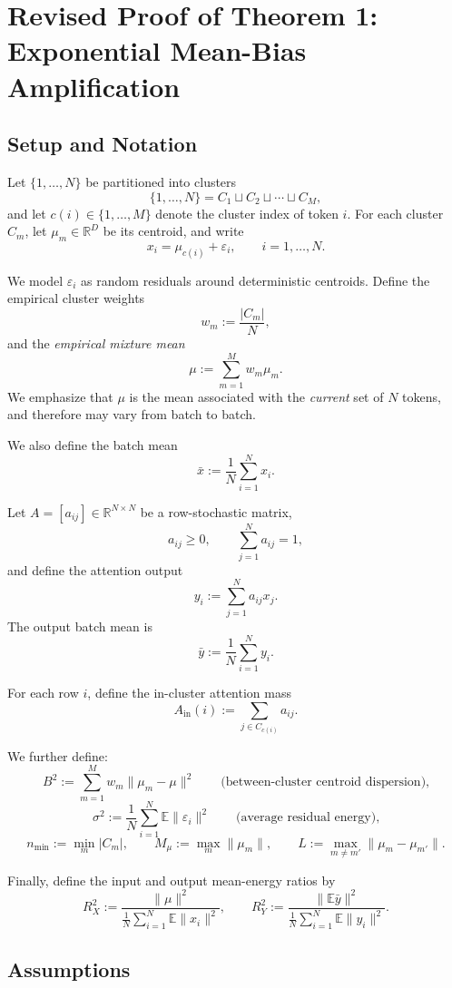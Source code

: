 \section{Revised Proof of Theorem 1: Exponential Mean-Bias Amplification}
\label{appendix:proof_theorem1_revised}

\subsection{Setup and Notation}

Let $\{1,\dots,N\}$ be partitioned into clusters
\[
\{1,\dots,N\} = C_1 \sqcup C_2 \sqcup \cdots \sqcup C_M,
\]
and let $c(i)\in\{1,\dots,M\}$ denote the cluster index of token $i$.
For each cluster $C_m$, let $\mu_m \in \mathbb{R}^D$ be its centroid, and write
\[
x_i = \mu_{c(i)} + \varepsilon_i,
\qquad i=1,\dots,N.
\]

We model $\varepsilon_i$ as random residuals around deterministic centroids.
Define the empirical cluster weights
\[
w_m := \frac{|C_m|}{N},
\]
and the \emph{empirical mixture mean}
\[
\mu := \sum_{m=1}^M w_m \mu_m.
\]
We emphasize that $\mu$ is the mean associated with the \emph{current} set of $N$ tokens, and therefore may vary from batch to batch.

We also define the batch mean
\[
\bar{x} := \frac{1}{N}\sum_{i=1}^N x_i.
\]

Let $A=[a_{ij}] \in \mathbb{R}^{N\times N}$ be a row-stochastic matrix,
\[
a_{ij}\ge 0,
\qquad
\sum_{j=1}^N a_{ij}=1,
\]
and define the attention output
\[
y_i := \sum_{j=1}^N a_{ij} x_j.
\]
The output batch mean is
\[
\bar{y} := \frac{1}{N}\sum_{i=1}^N y_i.
\]

For each row $i$, define the in-cluster attention mass
\[
A_{\mathrm{in}}(i) := \sum_{j\in C_{c(i)}} a_{ij}.
\]

We further define:
\[
B^2 := \sum_{m=1}^M w_m \|\mu_m-\mu\|^2
\qquad \text{(between-cluster centroid dispersion),}
\]
\[
\sigma^2 := \frac{1}{N}\sum_{i=1}^N \mathbb{E}\|\varepsilon_i\|^2
\qquad \text{(average residual energy),}
\]
\[
n_{\min} := \min_{m} |C_m|,
\qquad
M_\mu := \max_m \|\mu_m\|,
\qquad
L := \max_{m\neq m'} \|\mu_m-\mu_{m'}\|.
\]

Finally, define the input and output mean-energy ratios by
\[
R_X^2 := \frac{\|\mu\|^2}{\frac{1}{N}\sum_{i=1}^N \mathbb{E}\|x_i\|^2},
\qquad
R_Y^2 := \frac{\|\mathbb{E}\bar{y}\|^2}{\frac{1}{N}\sum_{i=1}^N \mathbb{E}\|y_i\|^2}.
\]

\subsection{Assumptions}

